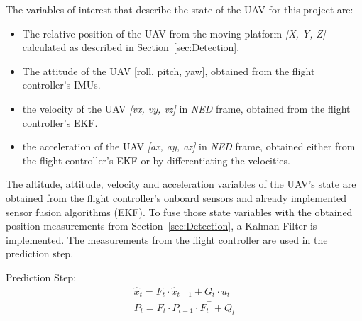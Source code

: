 \documentclass[conference, onecolumn, draftclsnofoot]{IEEEtran}
\begin{document}
The variables of interest that describe the state of the UAV for this project are:
%
\begin{itemize}

\item The relative position of the UAV from the moving platform \emph{[X, Y, Z]} 
calculated as described in Section~\ref{sec:Detection}.

\item The attitude of the UAV [roll, pitch, yaw], obtained from the flight controller's IMUs.

\item the velocity of the UAV \emph{[vx, vy, vz]} in \emph{NED} frame, obtained from 
the flight controller's EKF.


\item the acceleration of the UAV \emph{[ax, ay, az]} in \emph{NED} frame, obtained 
either from the flight controller's EKF or by differentiating the velocities.



\end{itemize}
%
The altitude, attitude, velocity and acceleration variables of the
UAV's state are obtained from the flight controller's onboard sensors
and already implemented sensor fusion algorithms (EKF). To fuse those
state variables with the obtained position measurements from
Section~\ref{sec:Detection}, a Kalman Filter is implemented. The
measurements from the flight controller are used in the prediction
step.


Prediction Step:
\begin{equation} 
 \begin{array}{l}
    \hat{x}_{t} = F_{t} \cdot \hat{x}_{t-1} + G_{t} \cdot u_{t} \\ 
    P_{t} = F_{t} \cdot P_{t-1} \cdot F_{t}^\top + Q_{t}
  \end{array}
\end{equation}
\end{document}
